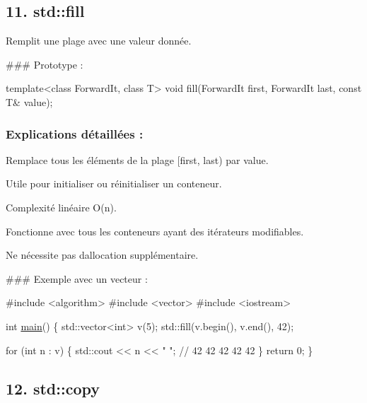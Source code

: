 \subsection*{11. {\bfseries std\+::fill}}

Remplit une plage avec une valeur donnée.

\#\#\# Prototype \+: 
\begin{DoxyCode}
\textcolor{keyword}{template}<\textcolor{keyword}{class} ForwardIt, \textcolor{keyword}{class} T>
\textcolor{keywordtype}{void} fill(ForwardIt first, ForwardIt last, \textcolor{keyword}{const} T& value);
\end{DoxyCode}


\subsubsection*{Explications détaillées \+:}


\begin{DoxyItemize}
\item Remplace tous les éléments de la plage {\ttfamily \mbox{[}first, last)} par {\ttfamily value}.
\item Utile pour initialiser ou réinitialiser un conteneur.
\item Complexité linéaire O(n).
\item Fonctionne avec tous les conteneurs ayant des itérateurs modifiables.
\item Ne nécessite pas d\textquotesingle{}allocation supplémentaire.
\end{DoxyItemize}

\#\#\# Exemple avec un vecteur \+: 
\begin{DoxyCode}
\textcolor{preprocessor}{#include <algorithm>}
\textcolor{preprocessor}{#include <vector>}
\textcolor{preprocessor}{#include <iostream>}

\textcolor{keywordtype}{int} \hyperlink{htop_8c_a3c04138a5bfe5d72780bb7e82a18e627}{main}() \{
    std::vector<int> v(5);
    std::fill(v.begin(), v.end(), 42);

    \textcolor{keywordflow}{for} (\textcolor{keywordtype}{int} n : v) \{
        std::cout << n << \textcolor{stringliteral}{" "}; \textcolor{comment}{// 42 42 42 42 42}
    \}
    \textcolor{keywordflow}{return} 0;
\}
\end{DoxyCode}
 



\subsection*{12. {\bfseries std\+::copy}}

